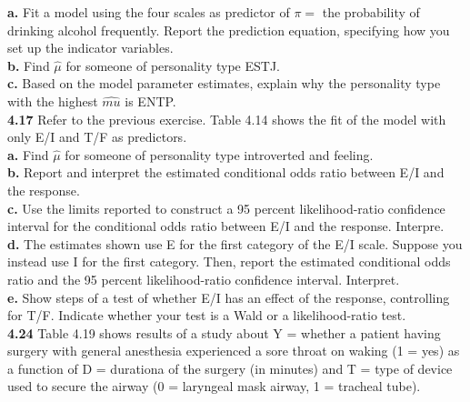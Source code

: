 \documentclass[paper=letter, fontsize=11pt]{scrartcl} %
\begin{document}
\textbf{a.} Fit a model using the four scales as predictor of $\pi =$ the probability of
drinking alcohol frequently. Report the prediction equation, specifying how you set up 
the indicator variables. \\

\textbf{b.} Find $\hat{\mu}$ for someone of personality type ESTJ. \\

\textbf{c.} Based on the model parameter estimates, explain why the personality type 
with the highest $\hat{mu}$ is ENTP. \\


\textbf{4.17} Refer to the previous exercise. Table 4.14 shows the fit of the model with only E/I and T/F as predictors. \\

\textbf{a.} Find $\hat{\mu}$ for someone of personality type introverted and feeling. \\

\textbf{b.} Report and interpret the estimated conditional odds ratio between E/I and
the response. \\

\textbf{c.} Use the limits reported to construct a 95 percent likelihood-ratio confidence
interval for the conditional odds ratio between E/I and the response. Interpre. \\

\textbf{d.} The estimates shown use E for the first category of the E/I scale. Suppose
you instead use I for the first category. Then, report the estimated conditional odds ratio and the 95 percent likelihood-ratio confidence interval. Interpret. \\

\textbf{e.} Show steps of a test of whether E/I has an effect of the response,
controlling for T/F. Indicate whether your test is a Wald or a likelihood-ratio test. \\

\textbf{4.24} Table 4.19 shows results of a study about Y = whether a patient having 
surgery with general anesthesia experienced a sore throat on waking (1 = yes) as a 
function of D = durationa of the surgery (in minutes) and T = type of device used to
secure the airway (0 = laryngeal mask airway, 1 = tracheal tube). \\
\end{document}

